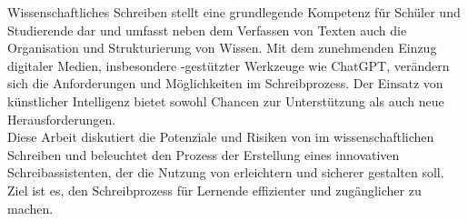 \documentclass[../main.tex]{subfiles}
\begin{document}
Wissenschaftliches Schreiben stellt eine grundlegende Kompetenz für Schüler und Studierende 
dar und umfasst neben dem Verfassen von Texten auch die Organisation und Strukturierung von Wissen. 
Mit dem zunehmenden Einzug digitaler Medien, insbesondere -gestützter Werkzeuge wie ChatGPT, verändern 
sich die Anforderungen und Möglichkeiten im Schreibprozess. Der Einsatz von künstlicher Intelligenz bietet sowohl 
Chancen zur Unterstützung als auch neue Herausforderungen.\\
Diese Arbeit diskutiert die Potenziale und Risiken von  im wissenschaftlichen Schreiben und beleuchtet den 
Prozess der Erstellung eines innovativen Schreibassistenten, der die Nutzung von  erleichtern und sicherer gestalten soll.
Ziel ist es, den Schreibprozess für Lernende effizienter und zugänglicher zu machen.
\end{document}
